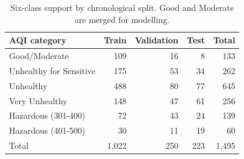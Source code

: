 \begin{table}[htbp]
\centering
\small
\caption{Six-class support by chronological split. Good and Moderate are merged for modelling.}
\label{tab:support}
\begin{tabular}{lrrrr}
\toprule
AQI category & Train & Validation & Test & Total \\
\midrule
Good/Moderate & 109 & 16 & 8 & 133 \\
Unhealthy for Sensitive & 175 & 53 & 34 & 262 \\
Unhealthy & 488 & 80 & 77 & 645 \\
Very Unhealthy & 148 & 47 & 61 & 256 \\
Hazardous (301-400) & 72 & 43 & 24 & 139 \\
Hazardous (401-500) & 30 & 11 & 19 & 60 \\
Total & 1,022 & 250 & 223 & 1,495 \\
\bottomrule
\end{tabular}

\end{table}
